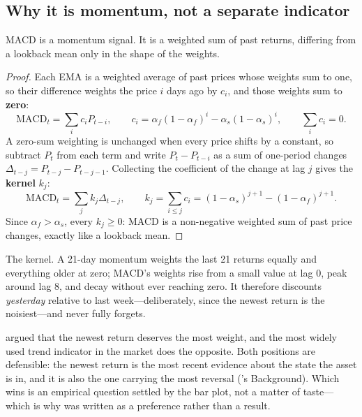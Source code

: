 \subsection{Why it is momentum, not a separate indicator}\label{sec:macd-is-momentum}

\begin{claim}\label{clm:macd-is-momentum}
MACD is a momentum signal. It is a weighted sum of past returns, differing from a lookback mean only
in the shape of the weights.
\end{claim}

\begin{proof}
Each EMA is a weighted average of past prices whose weights sum to one, so their difference weights
the price $i$ days ago by $c_i$, and those weights sum to \textbf{zero}:
\[
  \mathrm{MACD}_t = \sum_i c_i P_{t-i}, \qquad
  c_i = \alpha_f (1-\alpha_f)^i - \alpha_s (1-\alpha_s)^i, \qquad \sum_i c_i = 0 .
\]
A zero-sum weighting is unchanged when every price shifts by a constant, so subtract $P_t$ from each
term and write $P_t - P_{t-i}$ as a sum of one-period changes
$\Delta_{t-j} = P_{t-j} - P_{t-j-1}$. Collecting the coefficient of the change at lag $j$ gives the
\textbf{kernel} $k_j$:
\[
  \mathrm{MACD}_t = \sum_j k_j \Delta_{t-j}, \qquad
  k_j = \sum_{i \leq j} c_i = (1-\alpha_s)^{j+1} - (1-\alpha_f)^{j+1} .
\]
Since $\alpha_f > \alpha_s$, every $k_j \geq 0$: MACD is a non-negative weighted sum of past price
changes, exactly like a lookback mean.
\end{proof}

\begin{note}
The kernel. A 21-day momentum weights the last 21 returns equally and everything older at zero;
MACD's weights rise from a small value at lag 0, peak around lag 8, and decay without ever reaching
zero. It therefore discounts \emph{yesterday} relative to last week---deliberately, since the newest
return is the noisiest---and never fully forgets.
\end{note}


\begin{note}
 argued that the newest return deserves the most weight, and the most
widely used trend indicator in the market does the opposite. Both positions are defensible: the
newest return is the most recent evidence about the state the asset is in, and it is also the one
carrying the most reversal ('s Background). Which wins is an
empirical question settled by the bar plot, not a matter of taste---which is why
 was written as a preference rather than a result.
\end{note}

